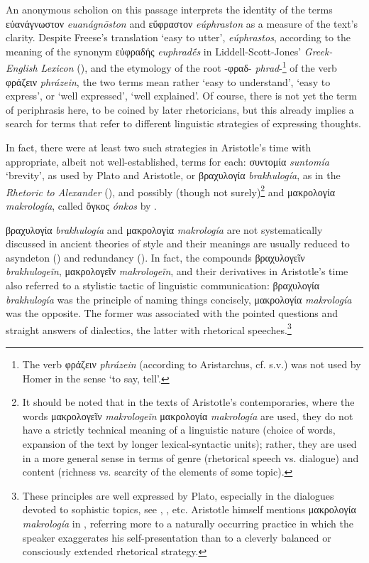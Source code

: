 \documentclass[output=paper,colorlinks,citecolor=brown]{langscibook}
\begin{document}
An anonymous scholion on this passage interprets the identity of the terms εὐανάγνωστον \textit{euanágnōston} and εὔφραστον \textit{eúphraston} as a measure of the text’s clarity. Despite Freese's translation ‘easy to utter', \textit{eúphrastos}, according to the meaning of the synonym εὐφραδής \textit{euphradḗs} in Liddell-Scott-Jones’ \textit{Greek-English Lexicon} (\citealt{Liddell-Scott-Jones1996}), and the etymology of the root -φραδ- \textit{phrad}-\footnote{The verb φράζειν \textit{phrázein} (according to Aristarchus, cf. \citealt{Liddell-Scott-Jones1996} s.v.) was not used by Homer in the sense ‘to say, tell'.} of the verb φράζειν \textit{phrázein}, the two terms mean rather ‘easy to understand', ‘easy to express', or ‘well expressed', ‘well explained'. Of course, there is not yet the term of periphrasis here, to be coined by later rhetoricians, but this already implies a search for terms that refer to different linguistic strategies of expressing thoughts.

\largerpage
In fact, there were at least two such strategies in Aristotle’s time with appropriate, albeit not well-established, terms for each: συντομία \textit{suntomía} ‘brevity', as used by Plato and Aristotle, or βραχυλογία \textit{brakhulogía}, as in the \textit{Rhetoric to Alexander} (), and possibly (though not surely)\footnote{It should be noted that in the texts of Aristotle’s contemporaries, where the words μακρολογεῖν \textit{makrologeĩn} μακρολογία \textit{makrología} are used, they do not have a strictly technical meaning of a linguistic nature (choice of words, expansion of the text by longer lexical-syntactic units); rather, they are used in a more general sense in terms of genre (rhetorical speech vs. dialogue) and content (richness vs. scarcity of the elements of some topic).} and μακρολογία \textit{makrología}, called ὄγκος \textit{ónkos} by . 

βραχυλογία \textit{brakhulogía} and μακρολογία \textit{makrología} are not systematically discussed in ancient theories of style and their meanings are usually reduced to asyndeton () and redundancy (). In fact, the compounds βραχυλογεῖν \textit{brakhulogeĩn}, μακρολογεῖν \textit{makrologeĩn}, and their derivatives in Aristotle’s time also referred to a stylistic tactic of linguistic communication: βραχυλογία \textit{brakhulogía} was the principle of naming things concisely, μακρολογία \textit{makrología} was the opposite. The former was associated with the pointed questions and straight answers of dialectics, the latter with rhetorical speeches.\footnote{These principles are well expressed by Plato, especially in the dialogues devoted to sophistic topics, see , ,  etc. Aristotle himself mentions μακρολογία \textit{makrología} in , referring more to a naturally occurring practice in which the speaker exaggerates his self-presentation than to a cleverly balanced or consciously extended rhetorical strategy.} 
\end{document}
